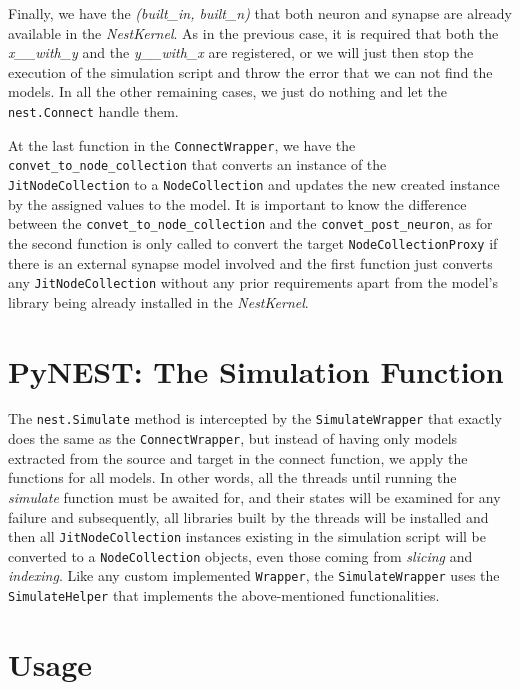Finally, we have the \emph{(built\_in, built\_n)} that both neuron and synapse are already available in the \emph{NestKernel}. As in the previous case, it is required that both the \emph{x\_\_with\_y} and the \emph{y\_\_with\_x} are registered, or we will just then stop the execution of the simulation script and throw the error that we can not find the models. In all the other remaining cases, we just do nothing and let the \texttt{nest.Connect} handle them.


At the last function in the \texttt{ConnectWrapper}, we have the \texttt{convet\_to\_node\_collection} that converts an instance of the \texttt{JitNodeCollection} to a \texttt{NodeCollection} and updates the new created instance by the assigned values to the model. It is important to know the difference between the \texttt{convet\_to\_node\_collection} and the \texttt{convet\_post\_neuron}, as for the second function is only called to convert the target \texttt{NodeCollectionProxy} if there is an external synapse model involved and the first function just converts any \texttt{JitNodeCollection} without any prior requirements apart from the model's library being already installed in the \emph{NestKernel}.
   
\section{PyNEST: The Simulation Function}
   
The \texttt{nest.Simulate} method is intercepted by the \texttt{SimulateWrapper} that exactly does the same as the \texttt{ConnectWrapper}, but instead of having only models extracted from the source and target in the connect function, we apply the functions for all models. In other words, all the threads until running the \emph{simulate} function must be awaited for, and their states will be examined for any failure and subsequently, all libraries built by the threads will be installed and then all \texttt{JitNodeCollection} instances existing in the simulation script will be converted to a \texttt{NodeCollection} objects, even those coming from \emph{slicing} and \emph{indexing}. Like any custom implemented \texttt{Wrapper}, the \texttt{SimulateWrapper} uses the \texttt{SimulateHelper} that implements the above-mentioned functionalities.






\section{Usage}


